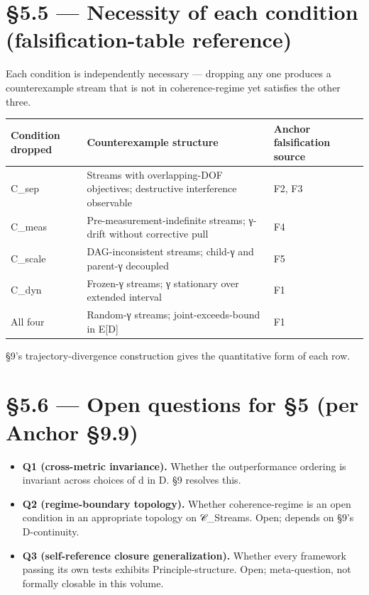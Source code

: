 \documentclass[11pt, openany]{book}
\newcommand{\sectionbreak}{\clearpage}
\begin{document}
\sectionbreak

\section{§5.5 --- Necessity of each condition (falsification-table reference)}

Each condition is independently necessary --- dropping any one produces a counterexample stream that is not in coherence-regime yet satisfies the other three.

\begingroup\setlength{\tabcolsep}{3pt}\renewcommand{\arraystretch}{1.15}\footnotesize
\begin{center}
\begin{tabular}{p{0.61in} p{2.74in} p{0.97in}}
\toprule
Condition dropped & Counterexample structure & Anchor falsification source \\
\midrule
C\_\allowbreak{}sep & Streams with overlapping-DOF objectives; destructive interference observable & F2, F3 \\
C\_\allowbreak{}meas & Pre-measurement-indefinite streams; γ-drift without corrective pull & F4 \\
C\_\allowbreak{}scale & DAG-inconsistent streams; child-γ and parent-γ decoupled & F5 \\
C\_\allowbreak{}dyn & Frozen-γ streams; γ stationary over extended interval & F1 \\
All four & Random-γ streams; joint-exceeds-bound in E[D] & F1 \\
\bottomrule
\end{tabular}
\end{center}
\endgroup
§9's trajectory-divergence construction gives the quantitative form of each row.

\sectionbreak

\section{§5.6 --- Open questions for §5 (per Anchor §9.9)}

\begin{itemize}
\item \textbf{Q1 (cross-metric invariance).} Whether the outperformance ordering is invariant across choices of d in D. §9 resolves this.
\item \textbf{Q2 (regime-boundary topology).} Whether coherence-regime is an open condition in an appropriate topology on 𝒞\_\allowbreak{}Streams. Open; depends on §9's D-continuity.
\item \textbf{Q3 (self-reference closure generalization).} Whether every framework passing its own tests exhibits Principle-structure. Open; meta-question, not formally closable in this volume.
\end{itemize}
\end{document}
